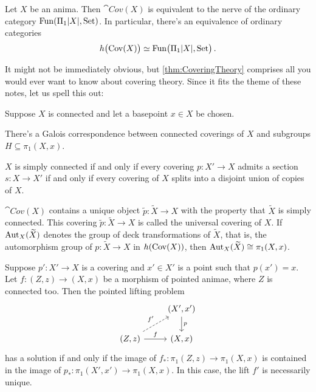 \begin{thm}\label{thm:CoveringTheory}
	Let $X$ be an anima. Then $\cat{Cov}(X)$ is equivalent to the nerve of the ordinary category $\Fun(\Pi_1\abs{X},\cat{Set})$. In particular, there's an equivalence of ordinary categories
	\begin{equation*}
		\ho\bigl(\cat{Cov}(X)\bigr)\simeq \Fun\bigl(\Pi_1\abs{X},\cat{Set}\bigr)\,.
	\end{equation*}
\end{thm}
It might not be immediately obvious, but \cref{thm:CoveringTheory} comprises all you would ever want to know about covering theory. Since it fits the theme of these notes, let us spell this out:

\begin{cor}\label{cor:CoveringTheory}
	Suppose $X$ is connected and let a basepoint $x\in X$ be chosen.
	\begin{alphanumerate}
		\item There's a Galois correspondence  between connected coverings of $X$ and subgroups $H\subseteq \pi_1(X,x)$.\label{enum:GaloisCorrespondence}
		\item $X$ is simply connected  if and only if every covering $p\colon X'\rightarrow X$ admits a section $s\colon X\rightarrow X'$ if and only if every covering of $X$ splits into a disjoint union of copies of $X$.\label{enum:SplitCovering}
		\item $\cat{Cov}(X)$ contains a unique object $\widetilde{p}\colon \widetilde{X}\rightarrow X$  with the property that $\widetilde{X}$ is simply connected. This covering $\widetilde{p}\colon \widetilde{X}\rightarrow X$ is called the universal covering of $X$. If $\operatorname{Aut}_X(\widetilde{X})$ denotes the group of deck transformations of $\widetilde{X}$, that is, the automorphism group of $p\colon \widetilde{X}\rightarrow X$ in $h(\mathrm{Cov}(X))$, then $\operatorname{Aut}_X(\widetilde{X})\cong \pi_1(X,x)$.\label{enum:UniversalCovering}
		\item Suppose $p'\colon X'\rightarrow X$ is a covering and $x'\in X'$ is a point such that $p(x')=x$. Let $f\colon (Z,z)\rightarrow (X,x)$ be a morphism of pointed animae, where $Z$ is connected too. Then the pointed lifting problem\label{enum:LiftingPropertyOfCoverings}
		\begin{equation*}
			\begin{tikzcd}
				& (X',x')\dar["p"]\\
				(Z,z)\urar[dashed,"f'"]\rar["f"] & (X,x)
			\end{tikzcd}
		\end{equation*}
		has a solution if and only if the image of $f_*\colon \pi_1(Z,z)\rightarrow \pi_1(X,x)$ is contained in the image of $p_*\colon \pi_1(X',x')\rightarrow \pi_1(X,x)$. In this case, the lift $f'$ is necessarily unique.
	\end{alphanumerate}
\end{cor}
